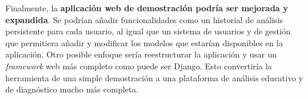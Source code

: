 Finalmente, la \textbf{aplicación web de demostración podría ser mejorada y expandida}. Se podrían añadir funcionalidades como un historial de análisis persistente para cada usuario, al igual que un sistema de usuarios y de gestión que permitiera añadir y modificar los modelos que estarían disponibles en la aplicación. Otro posible enfoque sería reestructurar la aplicación y usar un \textit{framework} web más completo como puede ser Django. Esto convertiría la herramienta de una simple demostración a una plataforma de análisis educativo y de diagnóstico mucho más completa.

